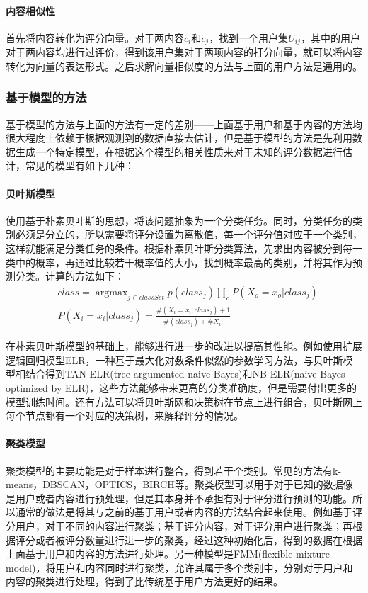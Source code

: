 \paragraph{内容相似性}
首先将内容转化为评分向量。对于两内容$c_i$和$c_j$，找到一个用户集$U_{ij}$，其中的用户对于两内容均进行过评价，得到该用户集对于两项内容的打分向量，就可以将内容转化为向量的表达形式。之后求解向量相似度的方法与上面的用户方法是通用的。

\subsubsection{基于模型的方法}
基于模型的方法与上面的方法有一定的差别——上面基于用户和基于内容的方法均很大程度上依赖于根据观测到的数据直接去估计，但是基于模型的方法是先利用数据生成一个特定模型，在根据这个模型的相关性质来对于未知的评分数据进行估计\cite{CFSurvey}，常见的模型有如下几种：
\paragraph{贝叶斯模型}
使用基于朴素贝叶斯的思想，将该问题抽象为一个分类任务。同时，分类任务的类别必须是分立的，所以需要将评分设置为离散值，每一个评分值对应于一个类别，这样就能满足分类任务的条件。根据朴素贝叶斯分类算法\cite{NaiveBayes}，先求出内容被分到每一类中的概率，再通过比较若干概率值的大小，找到概率最高的类别，并将其作为预测分类。计算的方法如下：
\begin{align}
    &class = \mathop{argmax}_{j \in classSet} p(class_j)\prod_{o}P(X_o = x_o|class_j)\\
    &P(X_i = x_i|class_j) = \frac{\#(X_i = x_i, class_j) + 1}{\#(class_j) + \#{X_i}|}
\end{align}

在朴素贝叶斯模型的基础上，能够进行进一步的改进以提高其性能。例如使用扩展逻辑回归模型ELR，一种基于最大化对数条件似然的参数学习方法\cite{ELR}，与贝叶斯模型相结合得到TAN-ELR(tree argumented naive Bayes)和NB-ELR(naive Bayes optimized by ELR)\cite{ELR}，这些方法能够带来更高的分类准确度，但是需要付出更多的模型训练时间。还有方法可以将贝叶斯网和决策树在节点上进行组合，贝叶斯网上每个节点都有一个对应的决策树，来解释评分的情况\cite{UserCF}。

\paragraph{聚类模型}
聚类模型的主要功能是对于样本进行整合，得到若干个类别。常见的方法有k-means，DBSCAN，OPTICS，BIRCH等\cite{Cluster}。聚类模型可以用于对于已知的数据像是用户或者内容进行预处理，但是其本身并不承担有对于评分进行预测的功能。所以通常的做法是将其与之前的基于用户或者内容的方法结合起来使用。例如基于评分用户，对于不同的内容进行聚类；基于评分内容，对于评分用户进行聚类；再根据评分或者被评分数量进行进一步的聚类，经过这种初始化后，得到的数据在根据上面基于用户和内容的方法进行处理。另一种模型是FMM(flexible mixture model)，将用户和内容同时进行聚类，允许其属于多个类别中，分别对于用户和内容的聚类进行处理，得到了比传统基于用户方法更好的结果\cite{FMM}。

